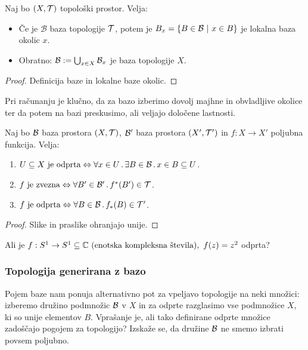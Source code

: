\begin{trditev}
    Naj bo $(X, \mathcal{T})$ topološki prostor. Velja:
    \begin{itemize}
        \item  Če je $\mathcal{B}$ baza topologije $\mathcal{T}$, potem je $B_x = \left\{B \in \mathcal{B} \ | \ x \in B\right\}$ je lokalna baza okolic $x$.
        \item Obratno: $\mathcal{B} := \bigcup_{x \in X} \mathcal{B}_x$ je baza topologije $X$.
    \end{itemize}    
\end{trditev}

\begin{proof}
    Definicija baze in lokalne baze okolic.
\end{proof}

Pri računanju je klučno, da za bazo izberimo dovolj majhne in obvladljive okolice ter da potem na bazi preskusimo, ali veljajo določene lastnosti.

\begin{trditev}
    Naj bo $\mathcal{B}$ baza prostora $(X, \mathcal{T})$, $\mathcal{B}'$ baza prostora $(X', \mathcal{T}')$ in $f: X \to X'$ poljubna funkcija. Velja:
    \begin{enumerate}
        \item $U \subseteq X \text{ je odprta} \Leftrightarrow \forall x \in U \,.\, \exists B \in \mathcal{B} \,.\, x \in B \subseteq U$.
        \item $f \text{ je zvezna} \Leftrightarrow \forall B' \in \mathcal{B}' \,.\, f^{*}(B') \in \mathcal{T}$.
        \item $f \text{ je odprta} \Leftrightarrow \forall B \in \mathcal{B} \,.\, f_{*}(B) \in \mathcal{T}'$.
    \end{enumerate}
\end{trditev}

\begin{proof}
    Slike in praslike ohranjajo unije.
\end{proof}

\begin{primer}
    Ali je $f: S^1 \to S^1 \subseteq \mathbb{C} \text{ (enotska kompleksna števila)}, \ f(z) = z^2$ odprta?
\end{primer}

\subsubsection{Topologija generirana z bazo}

Pojem baze nam ponuja alternativno pot za vpeljavo topologije na neki množici: izberemo družino podmnožic $\mathcal{B}$ v $X$ in za odprte razglasimo vse podmnožice $X$, ki so unije elementov $B$. Vprašanje je, ali tako definirane odprte množice zadoščajo pogojem za topologijo? Izskaže se, da družine $\mathcal{B}$ ne smemo izbrati povsem poljubno.

